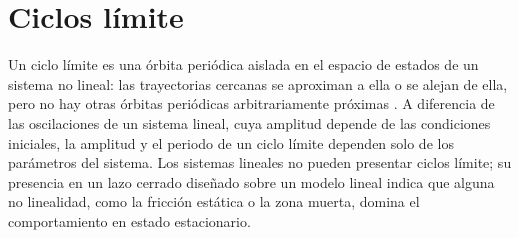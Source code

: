 \section{Ciclos límite}

Un ciclo límite es una órbita periódica aislada en el espacio de estados de un sistema no lineal: las trayectorias cercanas se aproximan a ella o se alejan de ella, pero no hay otras órbitas periódicas arbitrariamente próximas \cite{khalil2,jean}. A diferencia de las oscilaciones de un sistema lineal, cuya amplitud depende de las condiciones iniciales, la amplitud y el periodo de un ciclo límite dependen solo de los parámetros del sistema. Los sistemas lineales no pueden presentar ciclos límite; su presencia en un lazo cerrado diseñado sobre un modelo lineal indica que alguna no linealidad, como la fricción estática o la zona muerta, domina el comportamiento en estado estacionario.
